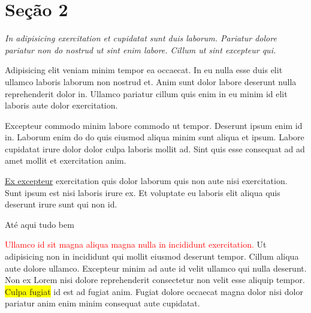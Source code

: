 \documentclass[12pt]{report}
\begin{document}
\newpage

\section{Seção 2}

\textit{
    In adipisicing exercitation et cupidatat sunt duis laborum. Pariatur dolore pariatur non do nostrud ut sint enim labore. Cillum ut sint excepteur qui.
}

Adipisicing elit veniam minim tempor ea occaecat. In eu nulla esse duis elit ullamco laboris laborum non nostrud et. Anim sunt dolor labore deserunt nulla reprehenderit dolor in. Ullamco pariatur cillum quis enim in eu minim id elit laboris aute dolor exercitation.

\begin{center}
    Excepteur commodo minim labore commodo ut tempor. Deserunt ipsum enim id in. Laborum enim do do quis eiusmod aliqua minim sunt aliqua et ipsum. Labore cupidatat irure dolor dolor culpa laboris mollit ad. Sint quis esse consequat ad ad amet mollit et exercitation anim.
\end{center}

\underline{Ex excepteur} exercitation quis dolor laborum quis non aute nisi exercitation. Sunt ipsum est nisi laboris irure ex. Et voluptate eu laboris elit aliqua quis deserunt irure sunt qui non id.

{\tiny Até aqui tudo bem}

\textcolor{red}{Ullamco id sit magna aliqua magna nulla in incididunt exercitation.} Ut adipisicing non in incididunt qui mollit eiusmod deserunt tempor. Cillum aliqua aute dolore ullamco. Excepteur minim ad aute id velit ullamco qui nulla deserunt. Non ex Lorem nisi dolore reprehenderit consectetur non velit esse aliquip tempor. \colorbox{yellow}{Culpa fugiat} id est ad fugiat anim. Fugiat dolore occaecat magna dolor nisi dolor pariatur anim enim minim consequat aute cupidatat.
\end{document}
